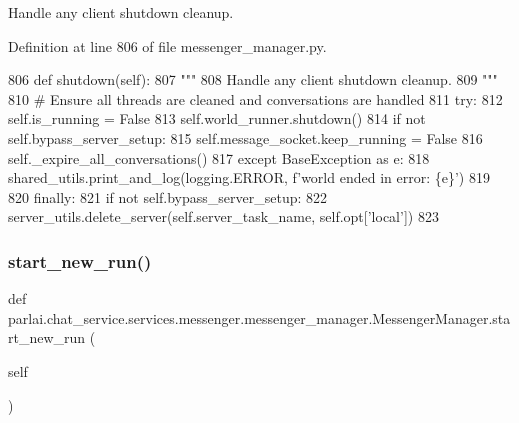 \begin{DoxyVerb}Handle any client shutdown cleanup.
\end{DoxyVerb}
 

Definition at line 806 of file messenger\+\_\+manager.\+py.


\begin{DoxyCode}
806     \textcolor{keyword}{def }shutdown(self):
807         \textcolor{stringliteral}{"""}
808 \textcolor{stringliteral}{        Handle any client shutdown cleanup.}
809 \textcolor{stringliteral}{        """}
810         \textcolor{comment}{# Ensure all threads are cleaned and conversations are handled}
811         \textcolor{keywordflow}{try}:
812             self.is\_running = \textcolor{keyword}{False}
813             self.world\_runner.shutdown()
814             \textcolor{keywordflow}{if} \textcolor{keywordflow}{not} self.bypass\_server\_setup:
815                 self.message\_socket.keep\_running = \textcolor{keyword}{False}
816             self.\_expire\_all\_conversations()
817         \textcolor{keywordflow}{except} BaseException \textcolor{keyword}{as} e:
818             shared\_utils.print\_and\_log(logging.ERROR, f\textcolor{stringliteral}{'world ended in error: \{e\}'})
819 
820         \textcolor{keywordflow}{finally}:
821             \textcolor{keywordflow}{if} \textcolor{keywordflow}{not} self.bypass\_server\_setup:
822                 server\_utils.delete\_server(self.server\_task\_name, self.opt[\textcolor{stringliteral}{'local'}])
823 
\end{DoxyCode}
\mbox{\label{classparlai_1_1chat__service_1_1services_1_1messenger_1_1messenger__manager_1_1MessengerManager_a76e86a89a5cbcdf013023f06b119039e}} 
\subsubsection{\texorpdfstring{start\+\_\+new\+\_\+run()}{start\_new\_run()}}
{\footnotesize\ttfamily def parlai.\+chat\+\_\+service.\+services.\+messenger.\+messenger\+\_\+manager.\+Messenger\+Manager.\+start\+\_\+new\+\_\+run (\begin{DoxyParamCaption}\item[{}]{self }\end{DoxyParamCaption})}

